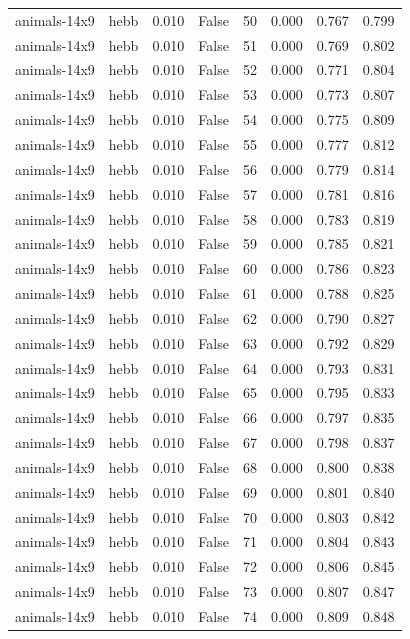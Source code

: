 \begin{tabular}{llrrrrrr}
animals-14x9 & hebb & 0.010 & False & 50 & 0.000 & 0.767 & 0.799 \\
animals-14x9 & hebb & 0.010 & False & 51 & 0.000 & 0.769 & 0.802 \\
animals-14x9 & hebb & 0.010 & False & 52 & 0.000 & 0.771 & 0.804 \\
animals-14x9 & hebb & 0.010 & False & 53 & 0.000 & 0.773 & 0.807 \\
animals-14x9 & hebb & 0.010 & False & 54 & 0.000 & 0.775 & 0.809 \\
animals-14x9 & hebb & 0.010 & False & 55 & 0.000 & 0.777 & 0.812 \\
animals-14x9 & hebb & 0.010 & False & 56 & 0.000 & 0.779 & 0.814 \\
animals-14x9 & hebb & 0.010 & False & 57 & 0.000 & 0.781 & 0.816 \\
animals-14x9 & hebb & 0.010 & False & 58 & 0.000 & 0.783 & 0.819 \\
animals-14x9 & hebb & 0.010 & False & 59 & 0.000 & 0.785 & 0.821 \\
animals-14x9 & hebb & 0.010 & False & 60 & 0.000 & 0.786 & 0.823 \\
animals-14x9 & hebb & 0.010 & False & 61 & 0.000 & 0.788 & 0.825 \\
animals-14x9 & hebb & 0.010 & False & 62 & 0.000 & 0.790 & 0.827 \\
animals-14x9 & hebb & 0.010 & False & 63 & 0.000 & 0.792 & 0.829 \\
animals-14x9 & hebb & 0.010 & False & 64 & 0.000 & 0.793 & 0.831 \\
animals-14x9 & hebb & 0.010 & False & 65 & 0.000 & 0.795 & 0.833 \\
animals-14x9 & hebb & 0.010 & False & 66 & 0.000 & 0.797 & 0.835 \\
animals-14x9 & hebb & 0.010 & False & 67 & 0.000 & 0.798 & 0.837 \\
animals-14x9 & hebb & 0.010 & False & 68 & 0.000 & 0.800 & 0.838 \\
animals-14x9 & hebb & 0.010 & False & 69 & 0.000 & 0.801 & 0.840 \\
animals-14x9 & hebb & 0.010 & False & 70 & 0.000 & 0.803 & 0.842 \\
animals-14x9 & hebb & 0.010 & False & 71 & 0.000 & 0.804 & 0.843 \\
animals-14x9 & hebb & 0.010 & False & 72 & 0.000 & 0.806 & 0.845 \\
animals-14x9 & hebb & 0.010 & False & 73 & 0.000 & 0.807 & 0.847 \\
animals-14x9 & hebb & 0.010 & False & 74 & 0.000 & 0.809 & 0.848 \\

\end{tabular}
